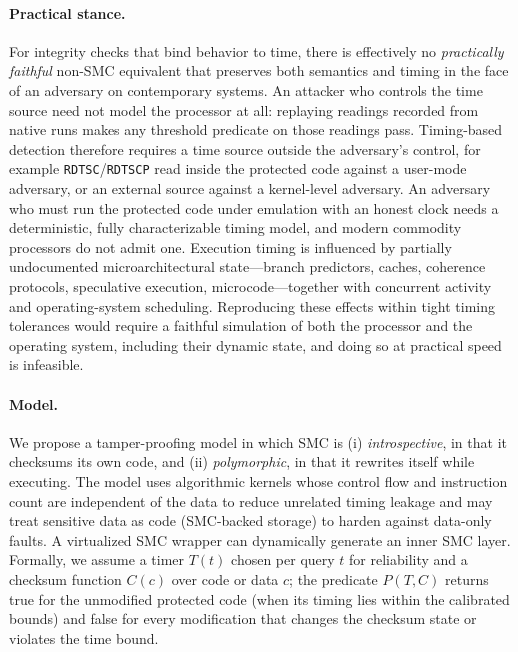 \documentclass[11pt]{article}
\begin{document}
\paragraph{Practical stance.}
For integrity checks that bind behavior to time, there is effectively no
\emph{practically faithful} non-SMC equivalent that preserves both semantics and
timing in the face of an adversary on contemporary systems.  An attacker who controls the time source need not model the processor at all: replaying readings recorded from native runs makes any threshold predicate on those readings pass.  Timing-based detection therefore requires a time source outside the adversary's control, for example \texttt{RDTSC}/\texttt{RDTSCP} read inside the protected code against a user-mode adversary, or an external source against a kernel-level adversary.  An adversary who must run the protected code under emulation with an honest clock needs a deterministic, fully characterizable timing model, and modern commodity processors do not admit one.
Execution timing is influenced by partially undocumented microarchitectural
state---branch predictors, caches, coherence protocols, speculative execution,
microcode---together with concurrent activity and operating-system scheduling.
Reproducing these effects within tight timing tolerances would require a faithful
simulation of both the processor and the operating system, including their
dynamic state, and doing so at practical speed is infeasible.

\paragraph{Model.}
We propose a tamper-proofing model in which SMC is (i) \emph{introspective}, in
that it checksums its own code, and (ii) \emph{polymorphic}, in that it rewrites
itself while executing.  The model uses algorithmic kernels whose control flow and instruction count are independent of the data to
reduce unrelated timing leakage and may treat sensitive data as code
(SMC-backed storage) to harden against data-only faults.  A virtualized SMC
wrapper can dynamically generate an inner SMC layer.  Formally, we assume a
timer $T(t)$ chosen per query $t$ for reliability and a checksum function $C(c)$
over code or data $c$; the predicate $P(T,C)$ returns true for the unmodified protected code (when its timing lies within the calibrated bounds) and false for every modification that changes the checksum state or violates the time bound.
\end{document}
